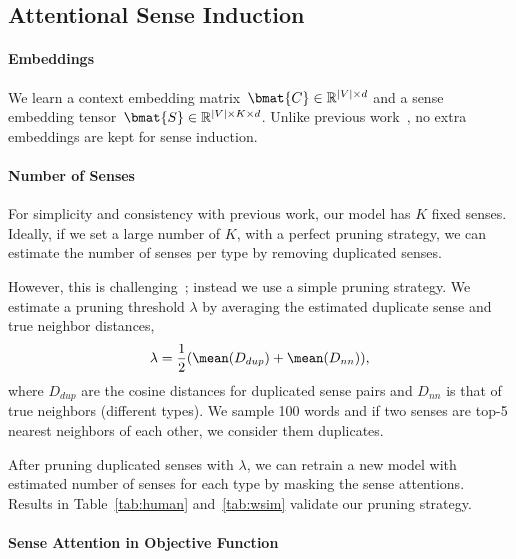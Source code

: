 \subsection{Attentional Sense Induction}
\label{sec:sasi}


\paragraph{Embeddings} 

We learn a context embedding matrix~$\bmat{C} \in
\mathbb{R}^{|V|\times d}$ and a sense embedding tensor~$\bmat{S} \in
\mathbb{R}^{|V|\times K \times d }$. Unlike previous
work~\citep{neelakantan2015efficient,Muse}, no extra embeddings are
kept for sense induction.

\paragraph{Number of Senses}

For simplicity and consistency with previous work, our model has
$K$ fixed senses. Ideally, if we set a large number of $K$, with a perfect
pruning strategy, we can estimate the number of senses per type by removing
duplicated senses.

However, this is challenging~\cite{mccarthy-16}; 
instead we use a simple pruning strategy.
We estimate a pruning threshold $\lambda$ by averaging 
the estimated duplicate sense and true neighbor distances,
\begin{equation}
\lambda = \frac{1}{2}(\mean(D_{dup}) + \mean(D_{nn})),
\label{eq:dup}
\end{equation}
where $D_{dup}$ are the cosine distances for duplicated sense pairs and $D_{nn}$ is
that of true neighbors (different types). We sample 100 words and 
if two senses are top-5 nearest neighbors of each other, we consider them duplicates.

After pruning duplicated senses with $\lambda$, we can retrain a new
model with estimated number of senses for each type by masking the
sense attentions. Results in
Table~\ref{tab:human} and~\ref{tab:wsim} validate our pruning
strategy.

\paragraph{Sense Attention in Objective Function}

